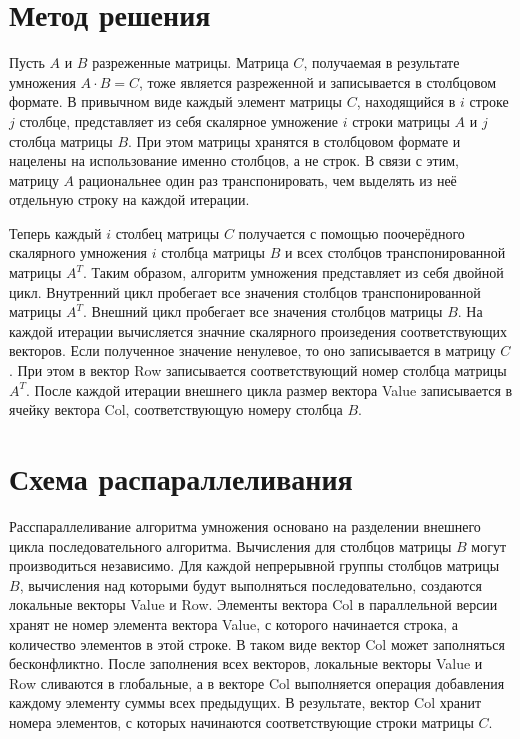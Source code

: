\documentclass{report}
\begin{document}
\section*{Метод решения}
Пусть $A$ и $B$ разреженные матрицы. Матрица $C$, получаемая в результате умножения $A\cdot B = C$, тоже является разреженной и записывается в столбцовом формате. В привычном виде каждый элемент матрицы $C$, находящийся в $i$ строке $j$ столбце, представляет из себя скалярное умножение $i$ строки матрицы $A$ и $j$ столбца матрицы $B$. При этом матрицы хранятся в столбцовом формате и нацелены на использование именно столбцов, а не строк. В связи с этим, матрицу $A$ рациональнее один раз транспонировать, чем выделять из неё отдельную строку на каждой итерации.
\par Теперь каждый $i$ столбец матрицы $C$ получается с помощью поочерёдного скалярного умножения $i$ столбца матрицы $B$ и всех столбцов транспонированной матрицы $A^T$. Таким образом, алгоритм умножения представляет из себя двойной цикл. Внутренний цикл пробегает все значения столбцов транспонированной матрицы $A^T$. Внешний цикл пробегает все значения столбцов матрицы $B$. На каждой итерации вычисляется значние скалярного произедения соответствующих векторов. Если полученное значение ненулевое, то оно записывается в матрицу $C$. При этом в вектор Row записывается соответствующий номер столбца матрицы $A^T$. После каждой итерации внешнего цикла размер вектора Value записывается в ячейку вектора Col, соответствующую номеру столбца $B$.
\newpage

\section*{Схема распараллеливания}
Расспараллеливание алгоритма умножения основано на разделении внешнего цикла последовательного алгоритма. Вычисления для столбцов матрицы $B$ могут производиться независимо. Для каждой непрерывной группы столбцов матрицы $B$, вычисления над которыми будут выполняться последовательно, создаются локальные векторы Value и Row. Элементы вектора Col в параллельной версии хранят не номер элемента вектора Value, с которого начинается строка, а количество элементов в этой строке. В таком виде вектор Col может заполняться бесконфликтно. После заполнения всех векторов, локальные векторы Value и Row сливаются в глобальные, а в векторе Col выполняется операция добавления каждому элементу суммы всех предыдущих. В результате, вектор Col хранит номера элементов, с которых начинаются соответствующие строки матрицы $C$.
\newpage
\end{document}
